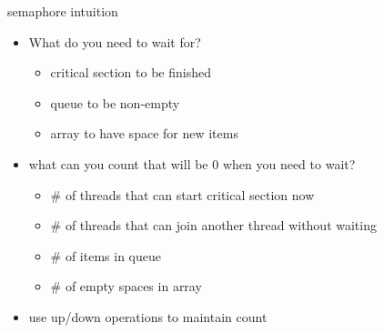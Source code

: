 \begin{frame}[fragile,label=semaphoreIntuition]{semaphore intuition}
\begin{itemize}
    \item What do you need to wait for?
        \begin{itemize}
            \item critical section to be finished
            \item queue to be non-empty
            \item array to have space for new items
        \end{itemize}
    \item what can you count that will be 0 when you need to wait?
        \begin{itemize}
            \item \# of threads that can start critical section now
            \item \# of threads that can join another thread without waiting
            \item \# of items in queue
            \item \# of empty spaces in array
        \end{itemize}
    \item use up/down operations to maintain count
\end{itemize}
\end{frame}
